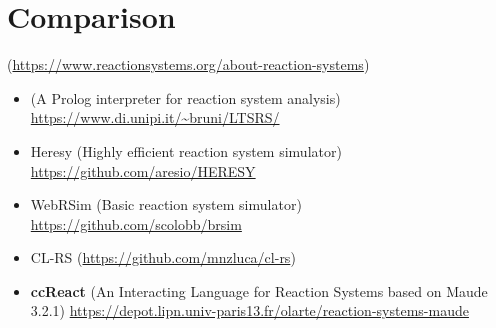 
\section{Comparison}\label{sec:related}
(\url{https://www.reactionsystems.org/about-reaction-systems})
\begin{itemize}
\item \BioResolve (A Prolog interpreter for reaction system analysis) \url{https://www.di.unipi.it/~bruni/LTSRS/}
\item Heresy (Highly efficient reaction system simulator) \url{https://github.com/aresio/HERESY }
\item WebRSim (Basic reaction system simulator) \url{https://github.com/scolobb/brsim}
\item CL-RS (\url{https://github.com/mnzluca/cl-rs})
\item \textbf{ccReact} (An Interacting Language for Reaction Systems based on Maude 3.2.1) \url{https://depot.lipn.univ-paris13.fr/olarte/reaction-systems-maude}
\end{itemize}


